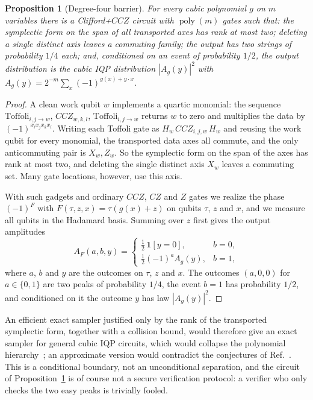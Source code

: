 \documentclass[a4paper,onecolumn,11pt,unpublished]{quantumarticle}
\theoremstyle{plain}
\newtheorem{proposition}[theorem]{Proposition}
\theoremstyle{remark}
\DeclareMathOperator{\poly}{poly}
\begin{document}
\begin{proposition}[Degree-four barrier]\label{prop:quartic}
For every cubic polynomial $g$ on $m$ variables there is a Clifford+$CCZ$ circuit with $\poly(m)$ gates such that: the symplectic form on the span of all transported axes has rank at most two; deleting a single distinct axis leaves a commuting family; the output has two strings of probability $1/4$ each; and, conditioned on an event of probability $1/2$, the output distribution is the cubic IQP distribution $|A_g(y)|^2$ with $A_g(y)=2^{-m}\sum_x(-1)^{g(x)+y\cdot x}$.
\end{proposition}

\begin{proof}
A clean work qubit $w$ implements a quartic monomial: the sequence $\mathrm{Toffoli}_{i,j\to w}$, $CCZ_{w,k,l}$, $\mathrm{Toffoli}_{i,j\to w}$ returns $w$ to zero and multiplies the data by $(-1)^{x_ix_jx_kx_l}$. Writing each Toffoli gate as $H_w\,CCZ_{i,j,w}\,H_w$ and reusing the work qubit for every monomial, the transported data axes all commute, and the only anticommuting pair is $X_w,Z_w$. So the symplectic form on the span of the axes has rank at most two, and deleting the single distinct axis $X_w$ leaves a commuting set. Many gate locations, however, use this axis.

With such gadgets and ordinary $CCZ$, $CZ$ and $Z$ gates we realize the phase $(-1)^{F}$ with $F(\tau,z,x)=\tau(g(x)+z)$ on qubits $\tau$, $z$ and $x$, and we measure all qubits in the Hadamard basis. Summing over $z$ first gives the output amplitudes
\[
A_F(a,b,y)=\begin{cases}\tfrac12\,\mathbf 1[y=0], & b=0,\\[2pt] \tfrac12(-1)^aA_g(y), & b=1,\end{cases}
\]
where $a$, $b$ and $y$ are the outcomes on $\tau$, $z$ and $x$. The outcomes $(a,0,0)$ for $a\in\{0,1\}$ are two peaks of probability $1/4$, the event $b=1$ has probability $1/2$, and conditioned on it the outcome $y$ has law $|A_g(y)|^2$.
\end{proof}

An efficient exact sampler justified only by the rank of the transported symplectic form, together with a collision bound, would therefore give an exact sampler for general cubic IQP circuits, which would collapse the polynomial hierarchy~\cite{BJS11}; an approximate version would contradict the conjectures of Ref.~\cite{BMS16}. This is a conditional boundary, not an unconditional separation, and the circuit of Proposition~\ref{prop:quartic} is of course not a secure verification protocol: a verifier who only checks the two easy peaks is trivially fooled.
\end{document}
